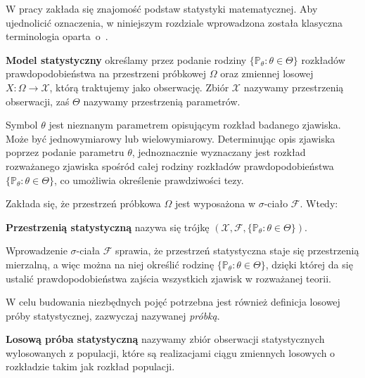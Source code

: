 W pracy zakłada się znajomość podstaw statystyki matematycznej. Aby ujednolicić oznaczenia, w niniejszym rozdziale wprowadzona została klasyczna terminologia oparta~o~\cite{niemiro}.

\begin{definition}
\textbf{Model statystyczny} określamy przez podanie rodziny $\{ \mathbb P_{\theta}:\theta\in\Theta\} $ rozkładów prawdopodobieństwa na przestrzeni próbkowej $\Omega$ oraz zmiennej losowej $X : \Omega \rightarrow \mathcal{X}$, którą traktujemy jako obserwację. Zbiór $\mathcal{X}$ nazywamy przestrzenią obserwacji, zaś $\Theta$ nazywamy przestrzenią parametrów. \\
\end{definition}
Symbol $\theta$ jest nieznanym parametrem opisującym rozkład badanego zjawiska. Może być jednowymiarowy lub wielowymiarowy. Determinując opis zjawiska poprzez podanie parametru $\theta$, jednoznacznie wyznaczany jest rozkład rozważanego zjawiska spośród całej rodziny rozkładów prawdopodobieństwa $\{ \mathbb P_{\theta}:\theta\in\Theta\}$, co umożliwia określenie prawdziwości tezy.
\par
Zakłada się, że przestrzeń próbkowa $\Omega$ jest wyposażona w $\sigma$-ciało $\mathcal{F}$. Wtedy:
\begin{definition}
\textbf{Przestrzenią statystyczną} nazywa się trójkę $(\mathcal{X},\mathcal{F},\{\mathbb P_{\theta}:\theta\in\Theta\})$.
\end{definition}
Wprowadzenie $\sigma$-ciała $\mathcal{F}$ sprawia, że przestrzeń statystyczna staje się przestrzenią mierzalną, a więc można na niej określić rodzinę $\{ \mathbb P_{\theta}:\theta\in\Theta\} $, dzięki której da się ustalić prawdopodobieństwa zajścia wszystkich zjawisk w rozważanej teorii.

W celu budowania niezbędnych pojęć potrzebna jest również definicja losowej próby statystycznej, zazwyczaj nazywanej \textit{próbką}.

\begin{definition}
 \textbf{Losową próba statystyczną} nazywamy zbiór obserwacji statystycznych wylosowanych z populacji, które są realizacjami ciągu zmiennych losowych o rozkładzie takim jak rozkład populacji.
 \end{definition}
